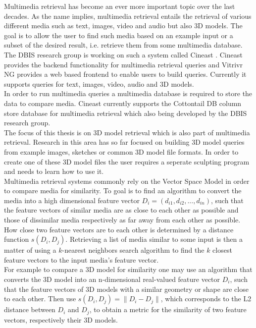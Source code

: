 Multimedia retrieval has become an ever more important topic over the last decades. As the name implies, multimedia retrieval entails the retrieval of various different media such as text, images, video and audio but also
3D models. The goal is to allow the user to find such media based on an example input or a subset of the desired result, i.e. retrieve them from some multimedia database.\\
The DBIS research group \cite{dbis_group} is working on such a system called Cineast \cite{cineast}. Cineast provides the backend functionality for multimedia retrieval queries and Vitrivr NG provides a web
based frontend to enable users to build queries. Currently it supports queries for text, images, video, audio and 3D models.\\
In order to run multimedia queries a multimedia database is required to store the data to compare media. Cineast currently supports the Cottontail DB \cite{cottontaildb} column store database for multimedia retrieval which also being developed by the DBIS research group.\\
The focus of this thesis is on 3D model retrieval which is also part of multimedia retrieval. Research in this area has so far focused on building 3D model queries from example images, sketches or common 3D model file formats.
In order to create one of these 3D model files the user requires a seperate sculpting program and needs to learn how to use it.\\
Multimedia retrieval systems commonly rely on the Vector Space Model \cite{vector_space_model:1975} in order to compare media for similarity. To goal is to find an algorithm to convert the media into a high dimensional feature vector $D_i = (d_{i1}, d_{i2}, ..., d_{in})$, such that the feature vectors of similar media are as close to each other as possible and those of dissimilar media respectively as far away from each other as possible. How close two feature vectors are to each other is determined by a distance function $s(D_i, D_j)$. Retrieving a list of media similar to some input is then a matter of using a $k$-nearest neighbors search \cite{k_nearest_neighbors:2000} algorithm to find the $k$ closest feature vectors to the input media's feature vector.\\
For example to compare a 3D model for similarity one may use an algorithm that converts the 3D model into an n-dimensional real-valued feature vector $D_i$, such that the feature vectors of 3D models with a similar geometry or shape are close to each other. Then use $s(D_i, D_j) = \lVert D_i - D_j \rVert$, which corresponds to the L2 distance between $D_i$ and $D_j$, to obtain a metric for the similarity of two feature vectors, respectively their 3D models.

